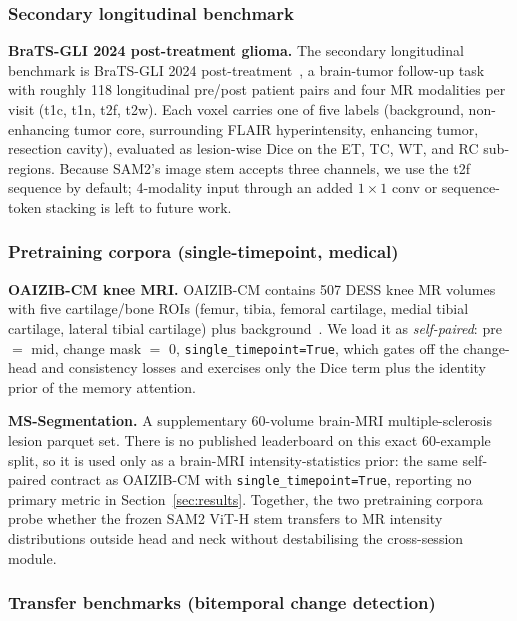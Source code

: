 \subsubsection{Secondary longitudinal benchmark}
\label{sec:exp_brats}

\textbf{BraTS-GLI 2024 post-treatment glioma.} The secondary
longitudinal benchmark is BraTS-GLI 2024
post-treatment~\cite{delarosa2024brats}, a brain-tumor follow-up task
with roughly 118 longitudinal pre/post patient pairs and four MR
modalities per visit (t1c, t1n, t2f, t2w). Each voxel carries one of
five labels (background, non-enhancing tumor core, surrounding
FLAIR hyperintensity, enhancing tumor, resection cavity), evaluated as
lesion-wise Dice on the ET, TC, WT, and RC sub-regions. Because
SAM2's image stem accepts three channels, we use the t2f sequence by
default; 4-modality input through an added $1{\times}1$ conv or
sequence-token stacking is left to future work.

\subsubsection{Pretraining corpora (single-timepoint, medical)}
\label{sec:exp_pretrain}

\textbf{OAIZIB-CM knee MRI.} OAIZIB-CM contains 507 DESS knee MR
volumes with five cartilage/bone ROIs (femur, tibia, femoral
cartilage, medial tibial cartilage, lateral tibial cartilage) plus
background~\cite{yao2023cartimorph}. We load it as
\emph{self-paired}: pre $=$ mid, change mask $=$ 0, \texttt{single\_timepoint=True},
which gates off the change-head and consistency losses and exercises
only the Dice term plus the identity prior of the memory attention.

\textbf{MS-Segmentation.} A supplementary 60-volume brain-MRI
multiple-sclerosis lesion parquet set. There is no published
leaderboard on this exact 60-example split, so it is used only as a
brain-MRI intensity-statistics prior: the same self-paired contract as
OAIZIB-CM with \texttt{single\_timepoint=True}, reporting no primary
metric in Section~\ref{sec:results}. Together, the two pretraining
corpora probe whether the frozen SAM2 ViT-H stem transfers to MR
intensity distributions outside head and neck without destabilising
the cross-session module.

\subsubsection{Transfer benchmarks (bitemporal change detection)}
\label{sec:exp_cd}

